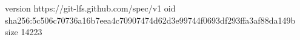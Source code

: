 version https://git-lfs.github.com/spec/v1
oid sha256:5c506c70736a16b7eea4c70907474d62d3e99744f0693df293ffa3af88da149b
size 14223
